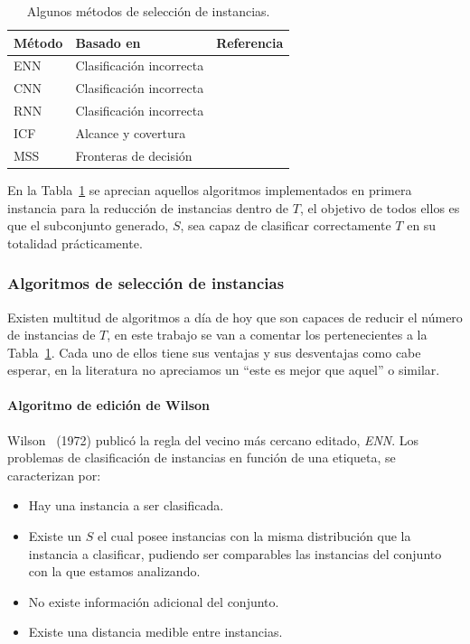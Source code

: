 \begin{table}[]
\begin{center}
	\begin{tabular}{llc}
	\toprule
	\rowcolor[HTML]{EFEFEF} 
	\textbf{Método} & \textbf{Basado en}       & \textbf{Referencia} \\ \midrule
	ENN             & Clasificación incorrecta &~\cite{wilson1972asymptotic}\\ \midrule
	\rowcolor[HTML]{EFEFEF} 
	CNN             & Clasificación incorrecta &~\cite{hart1968condensed}\\ \midrule
	RNN             & Clasificación incorrecta &~\cite{gates1972reduced}  \\ \midrule
	\rowcolor[HTML]{EFEFEF} 
	ICF             & Alcance y covertura      &~\cite{brighton2002advances}\\ \midrule
	MSS             & Fronteras de decisión    &~\cite{barandela2005decision}\\ \bottomrule
	\end{tabular}
\end{center}
\caption{Algunos métodos de selección de instancias.}
\label{tab:instance-selection-methods}
\end{table}

En la Tabla~\ref{tab:instance-selection-methods} se aprecian aquellos algoritmos implementados en primera instancia para la reducción de instancias dentro de $T$, el objetivo de todos ellos es que el subconjunto generado, $S$, sea capaz de clasificar correctamente  $T$ en su totalidad prácticamente.

\subsubsection{Algoritmos de selección de instancias}\label{subsubsec:Instance-Selection-Algorithms}
Existen multitud de algoritmos a día de hoy que son capaces de reducir el número de instancias de $T$, en este trabajo se van a comentar los pertenecientes a la Tabla~\ref{tab:instance-selection-methods}. Cada uno de ellos tiene sus ventajas y sus desventajas como cabe esperar, en la literatura no apreciamos un ``este es mejor que aquel'' o similar.

\paragraph{Algoritmo de edición de Wilson}\label{paragraph:ENN}
\hfill \break
Wilson~\cite{wilson1972asymptotic} (1972) publicó la regla del vecino más cercano editado, \textit{ENN}. Los problemas de clasificación de instancias en función de una etiqueta, se caracterizan por:
\begin{itemize}
\item Hay una instancia a ser clasificada.
\item Existe un $S$ el cual posee instancias con la misma distribución que la instancia a clasificar, pudiendo ser comparables las instancias del conjunto con la que estamos analizando.
\item No existe información adicional del conjunto.
\item Existe una distancia medible entre instancias.
\end{itemize}

